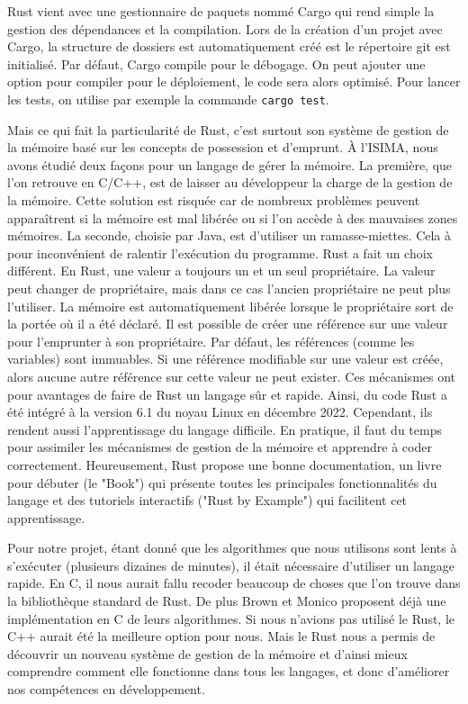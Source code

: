 Rust vient avec une gestionnaire de paquets nommé Cargo qui rend simple la gestion des dépendances et la compilation. Lors de la création d'un projet avec Cargo, la structure de dossiers est automatiquement créé est le répertoire git est initialisé. Par défaut, Cargo compile pour le débogage. On peut ajouter une option pour compiler pour le déploiement, le code sera alors optimisé. Pour lancer les tests, on utilise par exemple la commande \texttt{cargo test}.

Mais ce qui fait la particularité de Rust, c'est surtout son système de gestion de la mémoire basé sur les concepts de possession et d'emprunt. À l'ISIMA, nous avons étudié deux façons pour un langage de gérer la mémoire. La première, que l'on retrouve en C/C++, est de laisser au développeur la charge de la gestion de la mémoire. Cette solution est risquée car de nombreux problèmes peuvent apparaîtrent si la mémoire est mal libérée ou si l'on accède à des mauvaises zones mémoires. La seconde, choisie par Java, est d'utiliser un ramasse-miettes. Cela à pour inconvénient de ralentir l'exécution du programme. Rust a fait un choix différent. En Rust, une valeur a toujours un et un seul propriétaire. La valeur peut changer de propriétaire, mais dans ce cas l'ancien propriétaire ne peut plus l'utiliser. La mémoire est automatiquement libérée lorsque le propriétaire sort de la portée où il a été déclaré. Il est possible de créer une référence sur une valeur pour l'emprunter à son propriétaire. Par défaut, les références (comme les variables) sont immuables. Si une référence modifiable sur une valeur est créée, alors aucune autre référence sur cette valeur ne peut exister. Ces mécanismes ont pour avantages de faire de Rust un langage sûr et rapide. Ainsi, du code Rust a été intégré à la version 6.1 du noyau Linux en décembre 2022. Cependant, ils rendent aussi l'apprentissage du langage difficile. En pratique, il faut du temps pour assimiler les mécanismes de gestion de la mémoire et apprendre à coder correctement. Heureusement, Rust propose une bonne documentation, un livre pour débuter (le "Book") qui présente toutes les principales fonctionnalités du langage et des tutoriels interactifs ("Rust by Example") qui facilitent cet apprentissage.

Pour notre projet, étant donné que les algorithmes que nous utilisons sont lents à s'exécuter (plusieurs dizaines de minutes), il était nécessaire d'utiliser un langage rapide. En C, il nous aurait fallu recoder beaucoup de choses que l'on trouve dans la bibliothèque standard de Rust. De plus Brown et Monico proposent déjà une implémentation en C de leurs algorithmes. Si nous n'avions pas utilisé le Rust, le C++ aurait été la meilleure option pour nous. Mais le Rust nous a permis de découvrir un nouveau système de gestion de la mémoire et d'ainsi mieux comprendre comment elle fonctionne dans tous les langages, et donc d'améliorer nos compétences en développement.

